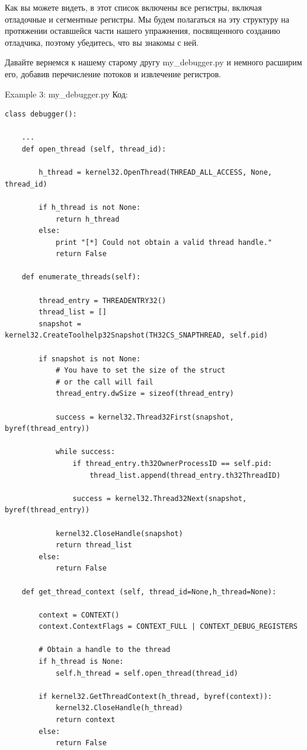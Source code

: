 \documentclass[12pt]{book}
\begin{document}
Как вы можете видеть, в этот список включены все регистры, включая отладочные и сегментные регистры. Мы будем полагаться на эту структуру на протяжении оставшейся части нашего упражнения, посвященного созданию отладчика, поэтому убедитесь, что вы знакомы с ней.

Давайте вернемся к нашему старому другу my\_debugger.py и немного расширим его, добавив перечисление потоков и извлечение регистров.

Example 3: my\_debugger.py
Код:
\begin{lstlisting}
class debugger():

    ...
    def open_thread (self, thread_id):

        h_thread = kernel32.OpenThread(THREAD_ALL_ACCESS, None, thread_id)

        if h_thread is not None:
            return h_thread
        else:
            print "[*] Could not obtain a valid thread handle."
            return False

    def enumerate_threads(self):

        thread_entry = THREADENTRY32()
        thread_list = []
        snapshot = kernel32.CreateToolhelp32Snapshot(TH32CS_SNAPTHREAD, self.pid)

        if snapshot is not None:
            # You have to set the size of the struct
            # or the call will fail
            thread_entry.dwSize = sizeof(thread_entry)

            success = kernel32.Thread32First(snapshot, byref(thread_entry))

            while success:
                if thread_entry.th32OwnerProcessID == self.pid:
                    thread_list.append(thread_entry.th32ThreadID)

                success = kernel32.Thread32Next(snapshot, byref(thread_entry))

            kernel32.CloseHandle(snapshot)
            return thread_list
        else:
            return False

    def get_thread_context (self, thread_id=None,h_thread=None):

        context = CONTEXT()
        context.ContextFlags = CONTEXT_FULL | CONTEXT_DEBUG_REGISTERS

        # Obtain a handle to the thread
        if h_thread is None:
            self.h_thread = self.open_thread(thread_id) 

        if kernel32.GetThreadContext(h_thread, byref(context)):
            kernel32.CloseHandle(h_thread)
            return context
        else:
            return False
\end{lstlisting}
\end{document}
